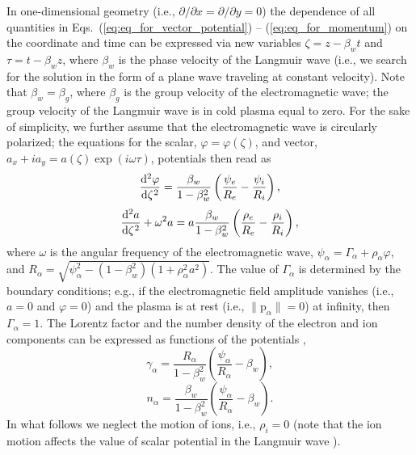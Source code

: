 \documentclass[10pt, a4paper, twoside, openright]{report}
\newcommand{\norm}[1]{\lVert#1\rVert}
\renewcommand{\vec}[1]{\boldsymbol{\mathrm{#1}}}
\begin{document}
In one-dimensional geometry (i.e., $ \partial / \partial x = \partial / \partial y = 0 $) the dependence of all quantities in Eqs.~(\ref{eq:eq_for_vector_potential}) -- (\ref{eq:eq_for_momentum}) on the coordinate and time can be expressed via new variables $ \zeta = z - \beta_{w} t $ and $ \tau = t - \beta_{w} z $, where $ \beta_{w} $ is the phase velocity of the Langmuir wave (i.e., we search for the solution in the form of a plane wave traveling at constant velocity). Note that $ \beta_w = \beta_g $, where $ \beta_g $ is the group velocity of the electromagnetic wave; the group velocity of the Langmuir wave is in cold plasma equal to zero. For the sake of simplicity, we further assume that the electromagnetic wave is circularly polarized; the equations for the scalar, $ \varphi = \varphi \left( \zeta \right) $, and vector, $ a_x + i a_y = a \left( \zeta \right) \exp \left( i \omega \tau \right) $, potentials then read as \cite{Farina2001, Bulanov2013, Bulanov2021}
\begin{equation}\label{eq:eq_for_scalar_potential_2}
\diff[2]{\varphi}{\zeta} = \frac{\beta_{w}}{1 - \beta_{w}^2} \left(\frac{\psi_e}{R_e} - \frac{\psi_i}{R_i} \right),
\end{equation}
\begin{equation}\label{eq:eq_for_vector_potential_2}
\diff[2]{a}{\zeta} + \omega^2 a = a \frac{\beta_{w}}{1 - \beta_{w}^2}  \left(\frac{\rho_e}{R_e} - \frac{\rho_i}{R_i} \right),
\end{equation}
where $ \omega $ is the angular frequency of the electromagnetic wave, $ \psi_{\alpha} = \mathit{\Gamma}_{\alpha} + \rho_{\alpha} \varphi $, and $ R_{\alpha} = \sqrt{\psi_{\alpha}^2 - \left(1 - \beta_w^2 \right) \left(1 + \rho_{\alpha}^2 a^2 \right)} $. The value of $ \mathit{\Gamma}_{\alpha} $ is determined by the boundary conditions; e.g., if the electromagnetic field amplitude vanishes (i.e., $ a = 0 $ and $ \varphi = 0 $) and the plasma is at rest (i.e., $ \norm{\vec{p}_{\alpha}} = 0 $) at infinity, then $ \mathit{\Gamma}_{\alpha} = 1 $. The Lorentz factor and the number density of the electron and ion components can be expressed as functions of the potentials \cite{Farina2001, Bulanov2013, Bulanov2021},
\begin{equation}\label{key}
\gamma_{\alpha} = \frac{R_{\alpha}}{1 - \beta_w^2} \left( \frac{\psi_{\alpha}}{R_{\alpha}} - \beta_w \right),
\end{equation}
\begin{equation}\label{key}
n_{\alpha} = \frac{\beta_w}{1 - \beta_w^2} \left( \frac{\psi_{\alpha}}{R_{\alpha}} - \beta_w \right).
\end{equation}
In what follows we neglect the motion of ions, i.e., $ \rho_i = 0 $ (note that the ion motion affects the value of scalar potential in the Langmuir wave \cite{Bulanov2021}). 
\end{document}
